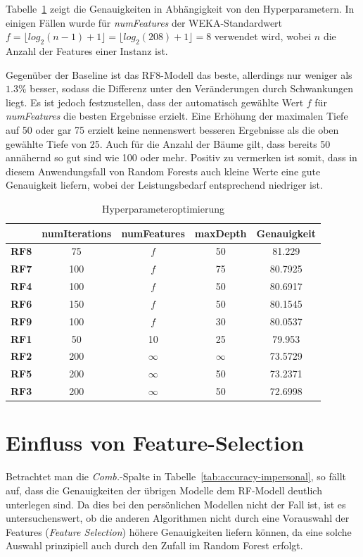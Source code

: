 Tabelle~\ref{tab:hyperparam-opt} zeigt die Genauigkeiten in Abhängigkeit von den Hyperparametern. In einigen Fällen wurde für \textit{numFeatures} der WEKA-Standardwert $f = \lfloor log_2(n - 1) + 1 \rfloor = \lfloor log_2(208) + 1 \rfloor = 8$ verwendet wird, wobei $n$ die Anzahl der Features einer Instanz ist.

Gegenüber der Baseline ist das RF8-Modell das beste, allerdings nur weniger als $1.3 \%$ besser, sodass die Differenz unter den Veränderungen durch Schwankungen liegt. Es ist jedoch festzustellen, dass der automatisch gewählte Wert $f$ für \textit{numFeatures} die besten Ergebnisse erzielt. Eine Erhöhung der maximalen Tiefe auf 50 oder gar 75 erzielt keine nennenswert besseren Ergebnisse als die oben gewählte Tiefe von 25. Auch für die Anzahl der Bäume gilt, dass bereits 50 annähernd so gut sind wie 100 oder mehr. Positiv zu vermerken ist somit, dass in diesem Anwendungsfall von Random Forests auch kleine Werte eine gute Genauigkeit liefern, wobei der Leistungsbedarf entsprechend niedriger ist.

\begin{table}
\centering
\begin{tabular}{|c|c|c|c||c|}
	\hline 
	& \textbf{numIterations} & \textbf{numFeatures} & \textbf{maxDepth} & \textbf{Genauigkeit} \\ 
	\hline 
	\textbf{RF8} & 75 & $f$ & 50 & 81.229 \\ 
	\hline 
	\textbf{RF7} & 100 & $f$ & 75 & 80.7925 \\ 
	\hline 
	\textbf{RF4} & 100 & $f$ & 50 & 80.6917 \\ 
	\hline 
	\textbf{RF6} & 150 & $f$ & 50 & 80.1545 \\ 
	\hline 
	\textbf{RF9} & 100 & $f$ & 30 & 80.0537 \\ 
	\hline 
	\textbf{RF1} & 50 & 10 & 25 & 79.953 \\ 
	\hline 
	\textbf{RF2} & 200 & $\infty$ & $\infty$ & 73.5729 \\ 
	\hline 
	\textbf{RF5} & 200 & $\infty$ & 50 & 73.2371 \\ 
	\hline 
	\textbf{RF3} & 200 & $\infty$ & 50 & 72.6998 \\ 
	\hline
\end{tabular}
\caption{Hyperparameteroptimierung}
\label{tab:hyperparam-opt}
\end{table}

\section{Einfluss von Feature-Selection}
Betrachtet man die \textit{Comb.}-Spalte in Tabelle~\ref{tab:accuracy-impersonal}, so fällt auf, dass die Genauigkeiten der übrigen Modelle dem RF-Modell deutlich unterlegen sind. Da dies bei den persönlichen Modellen nicht der Fall ist, ist es untersuchenswert, ob die anderen Algorithmen nicht durch eine Vorauswahl der Features (\textit{Feature Selection}) höhere Genauigkeiten liefern können, da eine solche Auswahl prinzipiell auch durch den Zufall im Random Forest erfolgt.

